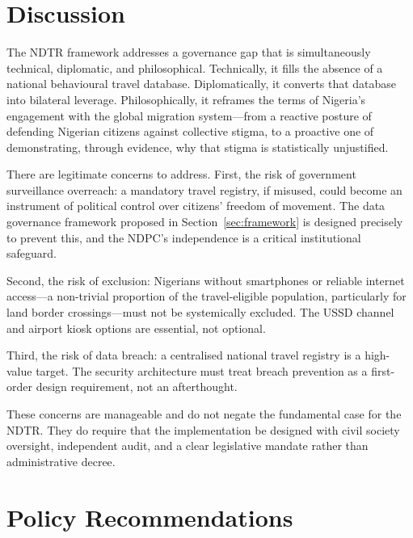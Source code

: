 \documentclass[11pt]{article}
\begin{document}
\section{Discussion}
\label{sec:discussion}

The NDTR framework addresses a governance gap that is simultaneously
technical, diplomatic, and philosophical. Technically, it fills the
absence of a national behavioural travel database. Diplomatically,
it converts that database into bilateral leverage. Philosophically,
it reframes the terms of Nigeria's engagement with the global migration
system---from a reactive posture of defending Nigerian citizens against
collective stigma, to a proactive one of demonstrating, through evidence,
why that stigma is statistically unjustified.

There are legitimate concerns to address. First, the risk of government
surveillance overreach: a mandatory travel registry, if misused, could
become an instrument of political control over citizens' freedom of
movement. The data governance framework proposed in
Section~\ref{sec:framework} is designed precisely to prevent this, and
the NDPC's independence is a critical institutional safeguard.

Second, the risk of exclusion: Nigerians without smartphones or reliable
internet access---a non-trivial proportion of the travel-eligible
population, particularly for land border crossings---must not be
systemically excluded. The USSD channel and airport kiosk options are
essential, not optional.

Third, the risk of data breach: a centralised national travel registry
is a high-value target. The security architecture must treat breach
prevention as a first-order design requirement, not an afterthought.

These concerns are manageable and do not negate the fundamental case
for the NDTR. They do require that the implementation be designed with
civil society oversight, independent audit, and a clear legislative
mandate rather than administrative decree.

\section{Policy Recommendations}
\label{sec:recommendations}
\end{document}
